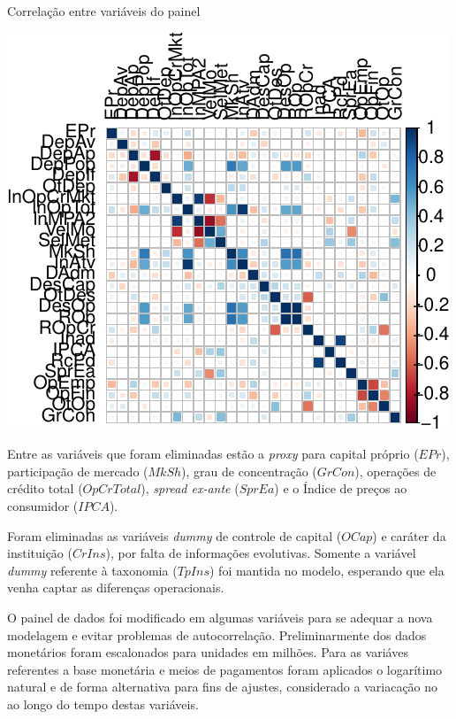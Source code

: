 \documentclass[12pt,12pt,openright,oneside,a4paper,chapter=TITLE,section=TITLE,subsection=TITLE,subsubsection=TITLE,english,french,spanish,portugues,sumario=tradicional]{abntex2}
\begin{document}
\begin{grafico}[!htbp]
\vspace{20pt}
\caption{Correlação entre variáveis do painel}
\vspace{-7mm}

\begin{center}\includegraphics{12-exportedfigures/chart.correlation-1} \end{center}
\vspace{-3mm}
\label{graf:corr}
\vspace{-2mm}
\end{grafico}

Entre as variáveis que foram eliminadas estão a \emph{proxy} para capital próprio (\(EPr\)), participação de mercado (\(MkSh\)), grau de concentração (\(GrCon\)), operações de crédito total (\(OpCrTotal\)), \emph{spread ex-ante} (\(SprEa\)) e o Índice de preços ao consumidor (\(IPCA\)).

Foram eliminadas as variáveis \emph{dummy} de controle de capital (\(OCap\)) e caráter da instituição (\(CrIns\)), por falta de informações evolutivas. Somente a variável \emph{dummy} referente à taxonomia (\(TpIns\)) foi mantida no modelo, esperando que ela venha captar as diferenças operacionais.

O painel de dados foi modificado em algumas variáveis para se adequar a nova modelagem e evitar problemas de autocorrelação. Preliminarmente dos dados monetários foram escalonados para unidades em milhões. Para as variáves referentes a base monetária e meios de pagamentos foram aplicados o logarítimo natural e de forma alternativa para fins de ajustes, considerado a variacação no ao longo do tempo destas variáveis.
\end{document}
